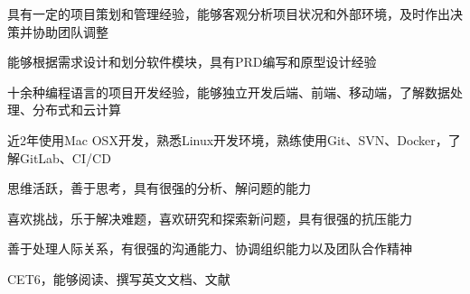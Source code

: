 


\begin{cventries}


\ljycventry
{
\begin{cvitems}
\item {具有一定的项目策划和管理经验，能够客观分析项目状况和外部环境，及时作出决策并协助团队调整}
\item {能够根据需求设计和划分软件模块，具有PRD编写和原型设计经验}
\item {十余种编程语言的项目开发经验，能够独立开发后端、前端、移动端，了解数据处理、分布式和云计算}
\item{近2年使用Mac OSX开发，熟悉Linux开发环境，熟练使用Git、SVN、Docker，了解GitLab、CI/CD}
\item{思维活跃，善于思考，具有很强的分析、解问题的能力}
\item{喜欢挑战，乐于解决难题，喜欢研究和探索新问题，具有很强的抗压能力}
\item{善于处理人际关系，有很强的沟通能力、协调组织能力以及团队合作精神}
\item{CET6，能够阅读、撰写英文文档、文献}
\end{cvitems}
}

\end{cventries}

